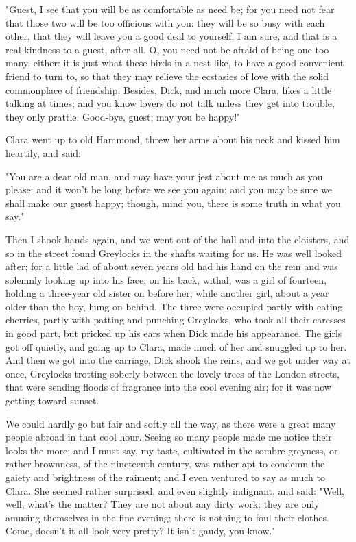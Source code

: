 "Guest, I see that you will be as comfortable as need be; for you need
not fear that those two will be too officious with you: they will be so
busy with each other, that they will leave you a good deal to yourself,
I am sure, and that is a real kindness to a guest, after all. O, you
need not be afraid of being one too many, either: it is just what these
birds in a nest like, to have a good convenient friend to turn to, so
that they may relieve the ecstasies of love with the solid commonplace
of friendship. Besides, Dick, and much more Clara, likes a little
talking at times; and you know lovers do not talk unless they get into
trouble, they only prattle. Good-bye, guest; may you be happy!"

Clara went up to old Hammond, threw her arms about his neck and kissed
him heartily, and said:

"You are a dear old man, and may have your jest about me as much as you
please; and it won't be long before we see you again; and you may be
sure we shall make our guest happy; though, mind you, there is some
truth in what you say."

Then I shook hands again, and we went out of the hall and into the
cloisters, and so in the street found Greylocks in the shafts waiting
for us. He was well looked after; for a little lad of about seven years
old had his hand on the rein and was solemnly looking up into his face;
on his back, withal, was a girl of fourteen, holding a three-year old
sister on before her; while another girl, about a year older than the
boy, hung on behind. The three were occupied partly with eating
cherries, partly with patting and punching Greylocks, who took all their
caresses in good part, but pricked up his ears when Dick made his
appearance. The girls got off quietly, and going up to Clara, made much
of her and snuggled up to her. And then we got into the carriage, Dick
shook the reins, and we got under way at once, Greylocks trotting
soberly between the lovely trees of the London streets, that were
sending floods of fragrance into the cool evening air; for it was now
getting toward sunset.

We could hardly go but fair and softly all the way, as there were a
great many people abroad in that cool hour. Seeing so many people made
me notice their looks the more; and I must say, my taste, cultivated in
the sombre greyness, or rather brownness, of the nineteenth century, was
rather apt to condemn the gaiety and brightness of the raiment; and I
even ventured to say as much to Clara. She seemed rather surprised, and
even slightly indignant, and said: "Well, well, what's the matter? They
are not about any dirty work; they are only amusing themselves in the
fine evening; there is nothing to foul their clothes. Come, doesn't it
all look very pretty? It isn't gaudy, you know."

